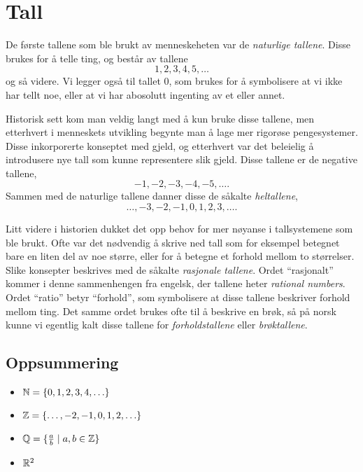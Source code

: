

\section{Tall}

De første tallene som ble brukt av menneskeheten var de \emph{naturlige tallene}. 
Disse brukes for å telle ting, og består av tallene 
$$1, 2, 3, 4, 5, \ldots$$
og så videre.
Vi legger også til tallet $0$, som brukes for å symbolisere at vi ikke har tellt noe, eller at vi har abosolutt ingenting av et eller annet. 

Historisk sett kom man veldig langt med å kun bruke disse tallene, men etterhvert i menneskets utvikling begynte man å lage mer rigorøse pengesystemer. 
Disse inkorporerte konseptet med gjeld, og etterhvert var det beleielig å introdusere nye tall som kunne representere slik gjeld. 
Disse tallene er de negative tallene, 
$$-1, -2, -3, -4, -5, \ldots.$$
Sammen med de naturlige tallene danner disse de såkalte \emph{heltallene}, 
$$\ldots, -3, -2, -1, 0, 1, 2, 3, \ldots . $$

Litt videre i historien dukket det opp behov for mer nøyanse i tallsystemene som ble brukt. 
Ofte var det nødvendig å skrive ned tall som for eksempel betegnet bare en liten del av noe større, eller for å betegne et forhold mellom to størrelser. 
Slike konsepter beskrives med de såkalte \emph{rasjonale tallene}. 
Ordet ``rasjonalt'' kommer i denne sammenhengen fra engelsk, der tallene heter \emph{rational numbers}. 
Ordet ``ratio'' betyr ``forhold'', som symbolisere at disse tallene beskriver forhold mellom ting. 
Det samme ordet brukes ofte til å beskrive en brøk, så på norsk kunne vi egentlig kalt disse tallene for \emph{forholdstallene} eller \emph{brøktallene}.





\subsection{Oppsummering}
\begin{itemize}
    \item $\mathbb{N} = \{0,1,2,3,4,\ldots \}$
    \item $\mathbb{Z} = \{\ldots, -2, -1, 0, 1, 2, \ldots\}$ 
    \item $\mathbb{Q} = \{\frac{a}{b} \mid a, b \in \mathbb{Z}\}$
    \item $\mathbb{R}^2$
\end{itemize}